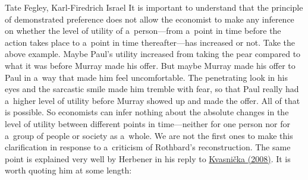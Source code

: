 \begin{artengenv2auth}{Tate Fegley, Karl-Firedrich Israel}
It is important to understand that the principle of demonstrated preference does not allow the economist to make any inference on whether the level of utility of a~person---from a~point in time before the action takes place to a~point in time thereafter---has increased or not. Take the above example. Maybe Paul's utility increased from taking the pear compared to what it was before Murray made his offer. But maybe Murray made his offer to Paul in a~way that made him feel uncomfortable. The penetrating look in his eyes and the sarcastic smile made him tremble with fear, so that Paul really had a~higher level of utility before Murray showed up and made the offer. All of that is possible. So economists can infer nothing about the absolute changes in the level of utility between different points in time---neither for one person nor for a~group of people or society as a~whole. We are not the first ones to make this clarification in response to a~criticism of Rothbard's reconstruction. The same point is explained very well by Herbener 
\parencite[][p.63]{herbener_defense_2008} %
 in his reply to \href{https://www.zotero.org/google-docs/?MN1lOj}{Kvasnička }\label{ref:RNDkFYd3iLdgE}\href{https://www.zotero.org/google-docs/?MN1lOj}{(2008)}. It is worth quoting him at some length:




\end{artengenv2auth}
